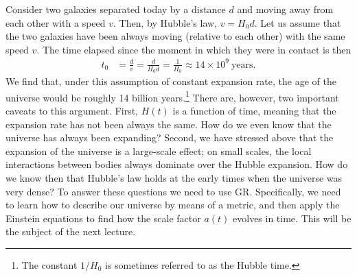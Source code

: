 Consider two galaxies separated today by a distance $d$ and moving away from each other with a speed $v$. Then, by Hubble's law, $v=H_0 d$. Let us assume that the two galaxies have been always moving (relative to each other) with the same speed $v$. The time elapsed since the moment in which they were in contact is then
\begin{equation}
\begin{split}
t_0&=\frac{d}{v}=\frac{d}{H_0 d}=\frac{1}{H_0}\approx 14\times10^9~\mathrm{years}.
\end{split}
\end{equation}
We find that, under this assumption of constant expansion rate, the age of the universe would be roughly 14 billion years.\footnote{The constant $1/H_0$ is sometimes referred to as the Hubble time.} There are, however, two important caveats to this argument. First, $H(t)$ is a function of time, meaning that the expansion rate has not been always the same. How do we even know that the universe has always been expanding? Second, we have stressed above that the expansion of the universe is a large-scale effect; on small scales, the local interactions between bodies always dominate over the Hubble expansion. How do we know then that Hubble's law holds at the early times when the universe was very dense? To answer these questions we need to use GR. Specifically, we need to learn how to describe our universe by means of a metric, and then apply the Einstein equations to find how the scale factor $a(t)$ evolves in time. This will be the subject of the next lecture.
